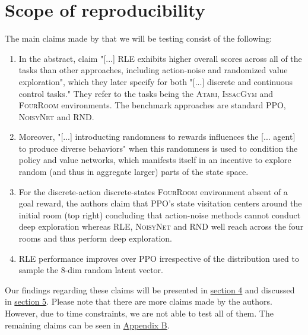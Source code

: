 \documentclass[10pt]{article} %
\begin{document}
\newpage
\section{Scope of reproducibility}
\label{sec:claims}

The main claims made by \cite{rle-paper} that we will be testing consist of the following:

\begin{enumerate}
    \item In the abstract, \cite{rle-paper} claim "[...] \textsc{RLE} exhibits higher overall scores across all of the tasks than other approaches, including action-noise and randomized value exploration", which they later specify for both "[...] discrete and continuous control tasks." They refer to the tasks being the \textsc{Atari}, \textsc{IssacGym} and \textsc{FourRoom} environments. The benchmark approaches are standard \textsc{PPO}, \textsc{NoisyNet} and \textsc{RND}.
    \item Moreover, "[...] introducting randomness to rewards influences the [... agent] to produce diverse behaviors" \citep{rle-paper} when this randomness is used to condition the policy and value networks, which manifests itself in an incentive to explore random (and thus in aggregate larger) parts of the state space.
    \item For the discrete-action discrete-states \textsc{FourRoom} environment absent of a goal reward, the authors claim that \textsc{PPO}'s state visitation centers around the initial room (top right) concluding that action-noise methods cannot conduct deep exploration whereas \textsc{RLE}, \textsc{NoisyNet} and \textsc{RND} well reach across the four rooms and thus perform deep exploration.
    \item \textsc{RLE} performance improves over \textsc{PPO} irrespective of the distribution used to sample the $8$-dim random latent vector.
\end{enumerate}

\noindent Our findings regarding these claims will be presented in \hyperlink{sec4}{section 4} and discussed in \hyperlink{sec5}{section 5}. Please note that there are more claims made by the authors. However, due to time constraints, we are not able to test all of them. The remaining claims can be seen in \hyperlink{untested-claims}{Appendix B}.
\end{document}
